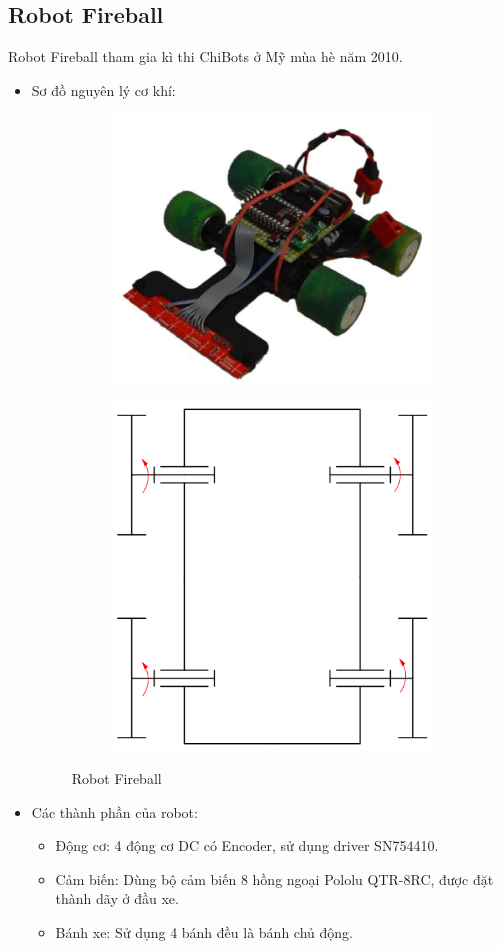     \subsection{Robot Fireball}
    \hspace*{0.6cm} Robot Fireball tham gia kì thi ChiBots ở Mỹ mùa hè năm 2010.
    \begin{itemize}
        \item Sơ đồ nguyên lý cơ khí:
        \begin{figure}[H]
            \begin{subfigure}{0.5\textwidth}
            \centering
            \includegraphics[width=0.6\linewidth, right]{pictures/chapter1/chapter1_pic13a_fireball.png} 
            \label{chap1_pic13a}
            \end{subfigure}
            \begin{subfigure}{0.6\textwidth}
            \includegraphics[width=0.5\linewidth]{pictures/chapter1/chapter1_pic13b_fireball.png}
            \label{chap1_pic13b}
            \end{subfigure}
            \caption{Robot Fireball}
            \label{chap1_pic13}
        \end{figure}
        \item Các thành phần của robot:
            \begin{itemize}[label=\textendash]
                \item Động cơ: 4 động cơ DC có Encoder, sử dụng driver SN754410.
                \item Cảm biến: Dùng bộ cảm biến 8 hồng ngoại Pololu QTR-8RC, được đặt thành dãy ở đầu xe.
                \item Bánh xe: Sử dụng 4 bánh đều là bánh chủ động.
            \end{itemize}
    \end{itemize}



